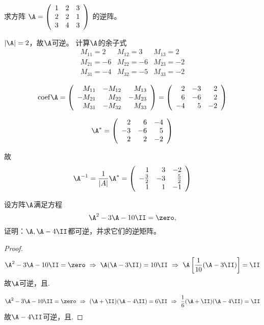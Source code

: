 \begin{li}
  求方阵
  $
  \A = \left(
    \begin{array}{ccc}
      1 & 2 & 3\\
      2 & 2 & 1\\
      3 & 4 & 3
    \end{array}
  \right)
  $
  的逆阵。
\end{li}
\begin{jie}
$|\A| = 2$，故$\A$可逆。 计算$\A$的余子式
$$
\begin{array}{lll}
  M_{11}=2 & M_{12}=3 & M_{13}=2\\
  M_{21}=-6 & M_{22}=-6 & M_{23}=-2\\
  M_{31}=-4 & M_{32}=-5 & M_{33}=-2
\end{array}
$$

$$
\mathrm{coef} \A = \left(
  \begin{array}{rrr}
    M_{11} & -M_{12} &  M_{13}\\
    -M_{21} &  M_{22} & -M_{23}\\
    M_{31} & -M_{32} &  M_{33}
  \end{array}
\right)  = \left(
  \begin{array}{rrr}
    2 & -3 &  2\\
    6 & -6 &  2 \\
    -4 & 5 & -2
  \end{array}
\right)
$$

$$
\A^* =  \left(
  \begin{array}{rrr}
    2 & 6 &  -4\\
    -3 & -6 & 5 \\
    2 & 2 & -2
  \end{array}
\right)
$$

故
$$
\A^{-1} = \frac1{|A|}\A^* = \left(
  \begin{array}{rrr}
    1 & 3 &  -2\\
    -\frac32 & -3 & \frac52 \\
    1 & 1 & -1
  \end{array}
\right)
$$
\end{jie}

\begin{li}
  设方阵$\A$满足方程
  $$
  \A^2 - 3\A - 10 \II = \zero,
  $$
  证明：$\A, \A-4\II$都可逆，并求它们的逆矩阵。      
\end{li}
\begin{proof}
$$
\A^2-3\A-10\II=\zero ~\Rightarrow~ \A(\A-3\II) = 10\II 
~\Rightarrow~ \A\left[\frac1{10}(\A-3\II)\right] = \II
$$  
故$\A$可逆，且.

$$
\A^2-3\A-10\II=\zero ~\Rightarrow~ (\A+\II)(\A-4\II) = 6\II 
~\Rightarrow~ \frac1{6}(\A+\II)(\A-4\II) = \II
$$     
故$\A-4\II$可逆，且.

\end{proof}

